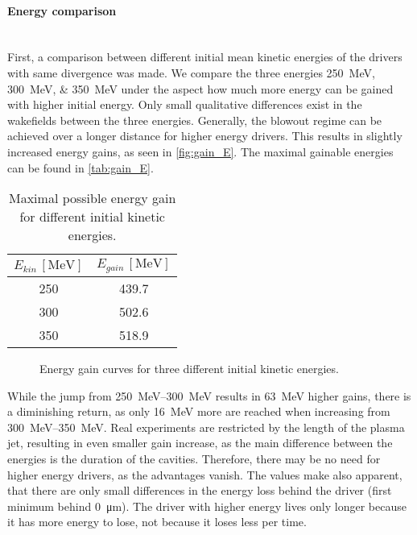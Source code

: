 \documentclass[bachelor_thesis]{subfiles}
\begin{document}
\paragraph*{Energy comparison}\hspace{0pt} \\
First, a comparison between different initial mean kinetic energies of the drivers with same divergence was made. We compare the three energies \qtylist{250; 300; 350}{\MeV} under the aspect how much more energy can be gained with higher initial energy.
Only small qualitative differences exist in the wakefields between the three energies. Generally, the blowout regime can be achieved over a longer distance for higher energy drivers.
This results in slightly increased energy gains, as seen in \autoref{fig:gain_E}. The maximal gainable energies can be found in \autoref{tab:gain_E}.
\begin{table}[h]
\begin{center}
\begin{tabular}{|c|c|} 
	\hline
 	$E_{kin} \, \mathrm{[MeV]}$ & $E_{gain} \, \mathrm{[MeV]}$ \\ 
 	\hline
	250 & 439.7 \\ 
 	300 & 502.6 \\
	350 & 518.9 \\
	\hline
\end{tabular}
\caption{Maximal possible energy gain for different initial kinetic energies.}\label{tab:gain_E}
\end{center}
\end{table}

\begin{figure}
	\centering
	
	\caption{Energy gain curves for three different initial kinetic energies.}
	\label{fig:gain_E}
\end{figure}

While the jump from \qtyrange{250}{300}{\MeV} results in \qty{63}{\MeV} higher gains, there is a diminishing return, as only \qty{16}{\MeV} more are reached when increasing from \qtyrange{300}{350}{\MeV}. Real experiments are restricted by the length of the plasma jet, 
resulting in even smaller gain increase, as the main difference between the energies is the duration of the cavities. Therefore, there may be no need for higher energy drivers, as the advantages vanish.
The values make also apparent, that there are only small differences in the energy loss behind the driver (first minimum behind \qty{0}{\um}). The driver with higher energy lives only longer because it has more energy to lose, not because it loses less per time.
\end{document}
